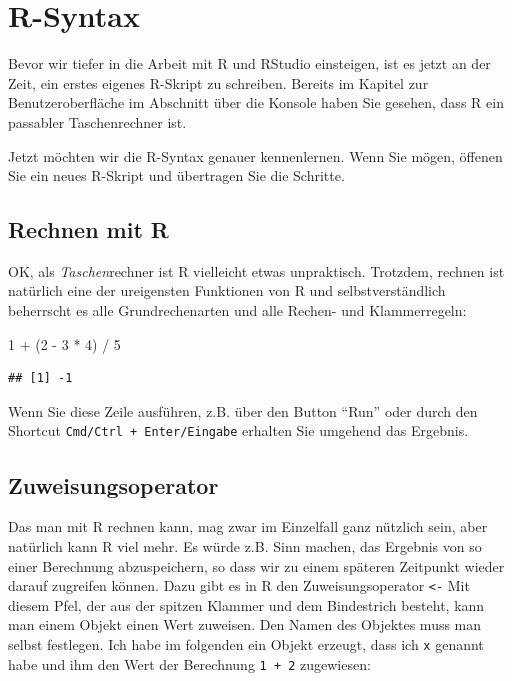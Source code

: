 \documentclass[
]{book}
\newenvironment{Shaded}{\begin{snugshade}}{\end{snugshade}}
\newcommand{\DecValTok}[1]{\textcolor[rgb]{0.00,0.00,0.81}{#1}}
\newcommand{\NormalTok}[1]{#1}
\newcommand{\SpecialCharTok}[1]{\textcolor[rgb]{0.00,0.00,0.00}{#1}}
\begin{document}
\hypertarget{r-syntax}{%
\section{R-Syntax}\label{r-syntax}}

Bevor wir tiefer in die Arbeit mit R und RStudio einsteigen, ist es jetzt an der Zeit, ein erstes eigenes R-Skript zu schreiben. Bereits im Kapitel zur Benutzeroberfläche im Abschnitt über die Konsole haben Sie gesehen, dass R ein passabler Taschenrechner ist.

Jetzt möchten wir die R-Syntax genauer kennenlernen. Wenn Sie mögen, öffenen Sie ein neues R-Skript und übertragen Sie die Schritte.

\hypertarget{rechnen-mit-r}{%
\subsection{Rechnen mit R}\label{rechnen-mit-r}}

OK, als \emph{Taschen}rechner ist R vielleicht etwas unpraktisch. Trotzdem, rechnen ist natürlich eine der ureigensten Funktionen von R und selbstverständlich beherrscht es alle Grundrechenarten und alle Rechen- und Klammerregeln:

\begin{Shaded}
\begin{Highlighting}[]
\DecValTok{1} \SpecialCharTok{+}\NormalTok{ (}\DecValTok{2} \SpecialCharTok{{-}} \DecValTok{3} \SpecialCharTok{*} \DecValTok{4}\NormalTok{) }\SpecialCharTok{/} \DecValTok{5} 
\end{Highlighting}
\end{Shaded}

\begin{verbatim}
## [1] -1
\end{verbatim}

Wenn Sie diese Zeile ausführen, z.B. über den Button ``Run'' oder durch den Shortcut \texttt{Cmd/Ctrl\ +\ Enter/Eingabe} erhalten Sie umgehend das Ergebnis.

\hypertarget{zuweisungsoperator}{%
\subsection{Zuweisungsoperator}\label{zuweisungsoperator}}

Das man mit R rechnen kann, mag zwar im Einzelfall ganz nützlich sein, aber natürlich kann R viel mehr. Es würde z.B. Sinn machen, das Ergebnis von so einer Berechnung abzuspeichern, so dass wir zu einem späteren Zeitpunkt wieder darauf zugreifen können. Dazu gibt es in R den Zuweisungsoperator \texttt{\textless{}-} Mit diesem Pfel, der aus der spitzen Klammer und dem Bindestrich besteht, kann man einem Objekt einen Wert zuweisen. Den Namen des Objektes muss man selbst festlegen. Ich habe im folgenden ein Objekt erzeugt, dass ich \texttt{x} genannt habe und ihm den Wert der Berechnung \texttt{1\ +\ 2} zugewiesen:
\end{document}

